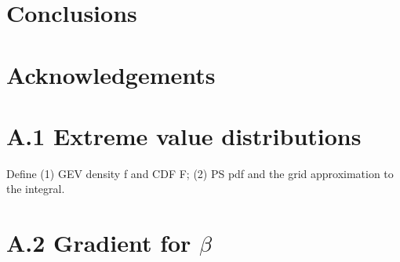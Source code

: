 \documentclass[11pt]{article}
\begin{document}
\section{Conclusions}\label{ebs:con}

\section*{Acknowledgements}

\section*{A.1 Extreme value distributions}
Define (1) GEV density f and CDF F; (2) PS pdf  and the grid approximation to the integral.

\section*{A.2 Gradient for $\beta$}

\begin{singlespace}


\end{singlespace}
\end{document}
